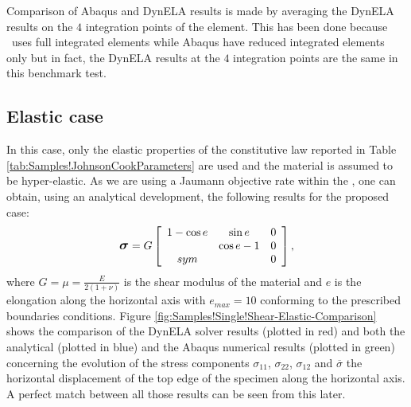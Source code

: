 Comparison of Abaqus and DynELA results is made by averaging the DynELA
results on the $4$ integration points of the element. This has been
done because \DynELA~uses full integrated elements while Abaqus
have reduced integrated elements only but in fact, the DynELA results
at the $4$ integration points are the same in this benchmark test.

\subsection{Elastic case}

In this case, only the elastic properties of the constitutive law
reported in Table \ref{tab:Samples!JohnsonCookParameters} are used
and the material is assumed to be hyper-elastic. As we are using a
Jaumann objective rate within the \DynELA, one can obtain, using
an analytical development, the following results for the proposed
case:
\begin{equation}
\mbox{\large\ensuremath{\boldsymbol{\sigma}}}=G\left[\begin{array}{ccc}
1-\cos e & \sin e & 0\\
 & \cos e-1 & 0\\
sym &  & 0
\end{array}\right],
\end{equation}
where $G=\mu=\frac{E}{2(1+\nu)}$ is the shear modulus of the material
and $e$ is the elongation along the horizontal axis with $e_{max}=10$
conforming to the prescribed boundaries conditions. Figure \ref{fig:Samples!Single!Shear-Elastic-Comparison}
shows the comparison of the DynELA solver results (plotted in red)
and both the analytical (plotted in blue) and the Abaqus numerical
results (plotted in green) concerning the evolution of the stress
components $\sigma_{11}$, $\sigma_{22}$, $\sigma_{12}$ and $\overline{\sigma}$
\versus  the horizontal displacement of the top edge of the specimen
along the horizontal axis. A perfect match between all those results
can be seen from this later.

